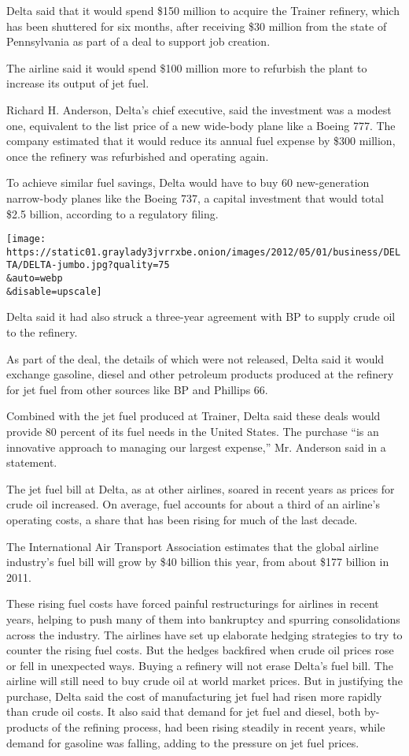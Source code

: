 Delta said that it would spend \$150 million to acquire the Trainer
refinery, which has been shuttered for six months, after receiving \$30
million from the state of Pennsylvania as part of a deal to support job
creation.

The airline said it would spend \$100 million more to refurbish the
plant to increase its output of jet fuel.

Richard H. Anderson, Delta's chief executive, said the investment was a
modest one, equivalent to the list price of a new wide-body plane like a
Boeing 777. The company estimated that it would reduce its annual fuel
expense by \$300 million, once the refinery was refurbished and
operating again.

To achieve similar fuel savings, Delta would have to buy 60
new-generation narrow-body planes like the Boeing 737, a capital
investment that would total \$2.5 billion, according to a regulatory
filing.

\texttt{[image: https://static01.graylady3jvrrxbe.onion/images/2012/05/01/business/DELTA/DELTA-jumbo.jpg?quality=75\\\&auto=webp\\\&disable=upscale]}

Delta said it had also struck a three-year agreement with BP to supply
crude oil to the refinery.

As part of the deal, the details of which were not released, Delta said
it would exchange gasoline, diesel and other petroleum products produced
at the refinery for jet fuel from other sources like BP and Phillips 66.

Combined with the jet fuel produced at Trainer, Delta said these deals
would provide 80 percent of its fuel needs in the United States. The
purchase ``is an innovative approach to managing our largest expense,''
Mr. Anderson said in a statement.

The jet fuel bill at Delta, as at other airlines, soared in recent years
as prices for crude oil increased. On average, fuel accounts for about a
third of an airline's operating costs, a share that has been rising for
much of the last decade.

The International Air Transport Association estimates that the global
airline industry's fuel bill will grow by \$40 billion this year, from
about \$177 billion in 2011.

These rising fuel costs have forced painful restructurings for airlines
in recent years, helping to push many of them into bankruptcy and
spurring consolidations across the industry. The airlines have set up
elaborate hedging strategies to try to counter the rising fuel costs.
But the hedges backfired when crude oil prices rose or fell in
unexpected ways. Buying a refinery will not erase Delta's fuel bill. The
airline will still need to buy crude oil at world market prices. But in
justifying the purchase, Delta said the cost of manufacturing jet fuel
had risen more rapidly than crude oil costs. It also said that demand
for jet fuel and diesel, both by-products of the refining process, had
been rising steadily in recent years, while demand for gasoline was
falling, adding to the pressure on jet fuel prices.


